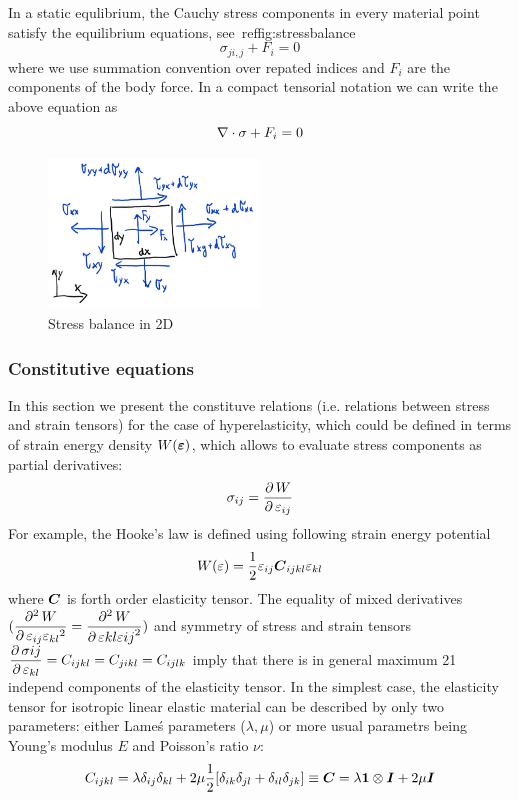 In a static equlibrium, the Cauchy stress components in every material point satisfy the equilibrium equations, see~ref{fig:stressbalance}
\begin{equation}
  \sigma_{ji, j} + F_i = 0
\end{equation}
where we use summation convention over repated indices and $F_i$ are the components of the body force. In a compact tensorial notation we can write the above equation as
\begin{equation}
  \nabla\cdot\sigma + F_i = 0
  \label{eq:staticequlibruim3d}
\end{equation}

\begin{figure}
  \begin{center}
    \includegraphics[width=0.5\textwidth]{figs/stressbalance2d.png}
  \end{center}
  \label{fig:stressbalance}
  \caption{Stress balance in 2D}
\end{figure}

\subsubsection{Constitutive equations}
In this section we present the constituve relations (i.e. relations between stress and strain tensors) for the case of hyperelasticity, which could be defined in terms of strain energy density $W(\mbox{\boldmath$\varepsilon$})$, which allows to evaluate stress components as partial derivatives:
$$
\sigma_{ij}=\mbox{$\displaystyle\frac{\partial \,{W}}{\partial \,{\varepsilon_{ij}}}$}
$$
For example, the Hooke's law  is defined using following strain energy potential
$$
W(\varepsilon) = \mbox{$\displaystyle\frac{1}{2}$}\varepsilon_{ij}\mbox{\boldmath$C$}_{ijkl}\varepsilon_{kl}
$$
where $\mbox{\boldmath$C$}$ is forth order elasticity tensor. The equality of mixed derivatives $(\mbox{$\displaystyle\frac{\partial ^{2}\,{W}}{\partial \,{\varepsilon_{ij}\varepsilon_{kl}}^{2}}$} = \mbox{$\displaystyle\frac{\partial ^{2}\,{W}}{\partial \,{\varepsilon{kl}\varepsilon{ij}}^{2}}$})$ and symmetry of stress and strain tensors $\mbox{$\displaystyle\frac{\partial \,{\sigma{ij}}}{\partial \,{\varepsilon_{kl}}}$} = C_{ijkl}=C_{jikl}=C_{ijlk}$ imply that there is in general maximum 21 independ components of the elasticity tensor.
In the simplest case, the elasticity tensor for isotropic linear elastic material  can be described by only two parameters: either Lame\'s parameters ($\lambda, \mu$) or more usual parametrs being Young's modulus $E$ and Poisson's ratio $\nu$:
$$
C_{ijkl}=\lambda\delta_{ij}\delta_{kl}+2\mu {1\over 2}[\delta_{ik}\delta_{jl}+
 \delta_{il}\delta_{jk}] \equiv \mbox{\boldmath$C$}=\lambda\mbox{\boldmath$1$}\otimes\mbox{\boldmath$I$}+2\mu\mbox{\boldmath$I$}
$$

